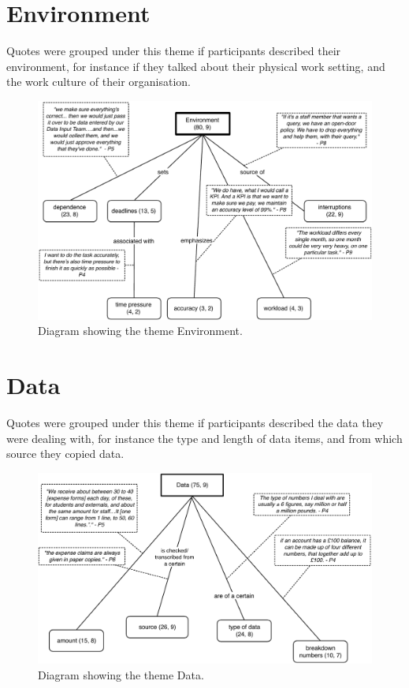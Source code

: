 \section{Environment}
Quotes were grouped under this theme if participants described their environment, for instance if they talked about their physical work setting, and the work culture of their organisation. 

\begin{figure}[!ht]
\centering
\includegraphics[width=\textwidth]{images/ch12/Environment.pdf}
\caption[Study 1 Environment diagram]{Diagram showing the theme Environment.}
\vspace{-9pt}
\label{fig:ch3_environment}
\end{figure}

\newpage

\section{Data}
Quotes were grouped under this theme if participants described the data they were dealing with, for instance the type and length of data items, and from which source they copied data.

\begin{figure}[!ht]
\centering
\includegraphics[width=\textwidth]{images/ch12/Data.pdf}
\caption[Study 1 Data diagram]{Diagram showing the theme Data.}
\vspace{-9pt}
\label{fig:ch3_data}
\end{figure}
\newpage
